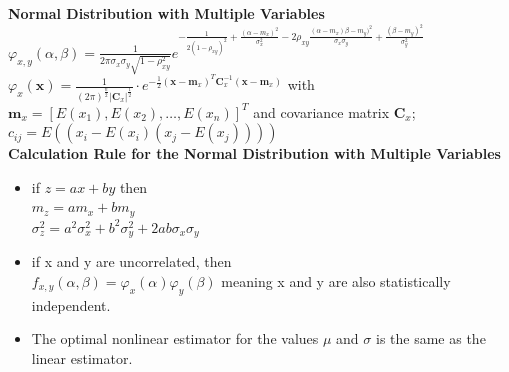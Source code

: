         \textbf{ Normal Distribution with Multiple Variables}\\
        $\varphi_{x,y}(\alpha,\beta)=\frac{1}{2\pi \sigma_x \sigma_y \sqrt{1-\rho_{xy}^2}}
            e^{-\frac{1}{2(1-\rho_{xy})^2} + \frac{(\alpha - m_x)^2}{\sigma_x^2}
            - 2\rho_{xy}\frac{(\alpha - m_x)\beta - m_y)^2}{\sigma_x \sigma_y} + \frac{(\beta - m_y)^2}{\sigma_y^2}}$\\
            $\varphi_x(\textbf{x})=\frac{1}{(2\pi)^{\frac{n}{2}}|\textbf{C}_x|^{\frac{1}{2}}}\cdot
            e^{-\frac{1}{2}(\textbf{x} - \textbf{m}_x)^T \textbf{C}_x^{-1} (\textbf{x} - \textbf{m}_x)}$ with \\
            $\textbf{m}_x=[E(x_1), E(x_2), \ldots, E(x_n)]^T$ and covariance matrix $\textbf{C}_x$; $c_{ij} = E((x_i-E(x_i)(x_j-E(x_j))))$ \\
        \textbf{Calculation Rule for the Normal Distribution with Multiple Variables}
        \begin{itemize}
          \item if $z=a x + b y$ then \\
          $m_z =  a m_x + b m_y$\\
          $\sigma_z^2 = a^2\sigma_x^2 + b^2\sigma_y^2+2ab\sigma_x\sigma_y$
          \item if x and y are uncorrelated, then \\
                $f_{x,y}(\alpha, \beta) = \varphi_x(\alpha)\varphi_y(\beta)$ meaning x and y are also statistically independent.
          \item The optimal nonlinear estimator for the values $\mu$ and $\sigma$ is the same as the linear estimator.
        \end{itemize}


